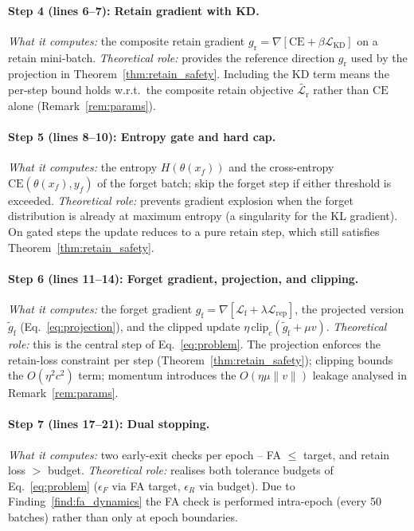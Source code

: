 \documentclass{article}
\newcommand{\CE}{\mathrm{CE}}
\newcommand{\gf}{g_{\mathrm{f}}}
\newcommand{\gr}{g_{\mathrm{r}}}
\newcommand{\gproj}{\tilde{g}_{\mathrm{f}}}
\newcommand{\lossf}{\mathcal{L}_{\mathrm{f}}}
\newcommand{\lossr}{\mathcal{L}_{\mathrm{r}}}
\newcommand{\lossrep}{\mathcal{L}_{\mathrm{rep}}}
\newcommand{\losskd}{\mathcal{L}_{\mathrm{KD}}}
\begin{document}
{\paragraph{Step 4 (lines 6--7): Retain gradient with KD.}
\emph{What it computes:} the composite retain gradient $\gr = \nabla[\CE + \beta\losskd]$ on a retain mini-batch.
\emph{Theoretical role:} provides the reference direction $\gr$ used by the projection in Theorem~\ref{thm:retain_safety}. Including the KD term means the per-step bound holds w.r.t.\ the composite retain objective $\widetilde{\lossr}$ rather than $\CE$ alone (Remark~\ref{rem:params}).

\paragraph{Step 5 (lines 8--10): Entropy gate and hard cap.}
\emph{What it computes:} the entropy $H(\theta(x_f))$ and the cross-entropy $\CE(\theta(x_f), y_f)$ of the forget batch; skip the forget step if either threshold is exceeded.
\emph{Theoretical role:} prevents gradient explosion when the forget distribution is already at maximum entropy (a singularity for the KL gradient). On gated steps the update reduces to a pure retain step, which still satisfies Theorem~\ref{thm:retain_safety}.

\paragraph{Step 6 (lines 11--14): Forget gradient, projection, and clipping.}
\emph{What it computes:} the forget gradient $\gf = \nabla[\lossf + \lambda\lossrep]$, the projected version $\gproj$ (Eq.~\ref{eq:projection}), and the clipped update $\eta\,\mathrm{clip}_c(\gproj + \mu v)$.
\emph{Theoretical role:} this is the central step of Eq.~\ref{eq:problem}. The projection enforces the retain-loss constraint per step (Theorem~\ref{thm:retain_safety}); clipping bounds the $O(\eta^2 c^2)$ term; momentum introduces the $O(\eta\mu\|v\|)$ leakage analysed in Remark~\ref{rem:params}.

\paragraph{Step 7 (lines 17--21): Dual stopping.}
\emph{What it computes:} two early-exit checks per epoch -- FA $\le$ target, and retain loss $>$ budget.
\emph{Theoretical role:} realises both tolerance budgets of Eq.~\ref{eq:problem} ($\epsilon_F$ via FA target, $\epsilon_R$ via budget). Due to Finding~\ref{find:fa_dynamics} the FA check is performed intra-epoch (every 50 batches) rather than only at epoch boundaries.
}
\end{document}
